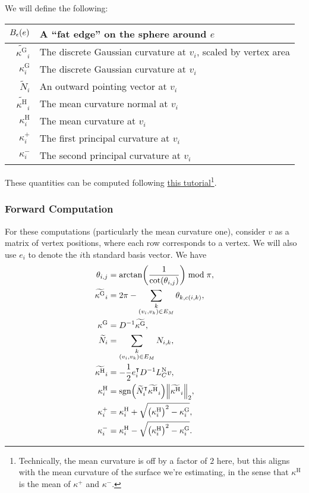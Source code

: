 
We will define the following: \begin{center}\begin{tabular}{r|l}
	\(B_{\epsilon}\pof{e}\) & A ``fat edge'' on the sphere around \(e\) \\ \hline
	\(\widetilde{\kappa^\text{G}}_i\) & The discrete Gaussian curvature at \(v_i\), scaled by vertex area \\ \hline
	\(\kappa^\text{G}_i\) & The discrete Gaussian curvature at \(v_i\) \\ \hline
	\(\widetilde{N}_i\) & An outward pointing vector at \(v_i\) \\ \hline
	\(\widetilde{\kappa^\text{H}}_i\) & The mean curvature normal at \(v_i\) \\ \hline
	\(\kappa^\text{H}_i\) & The mean curvature at \(v_i\) \\ \hline
	\(\kappa^+_i\) & The first principal curvature at \(v_i\) \\ \hline
	\(\kappa^-_i\) & The second principal curvature at \(v_i\)
\end{tabular}\end{center} These quantities can be computed following \href{https://libigl.github.io/libigl-python-bindings/tut-chapter1/}{this tutorial}\footnote{Technically, the mean curvature is off by a factor of \(2\) here, but this aligns with the mean curvature of the surface we're estimating, in the sense that \(\kappa^{\text{H}}\) is the mean of \(\kappa^+\) and \(\kappa^-\).}.

\subsubsection{Forward Computation}
For these computations (particularly the mean curvature one), consider \(v\) as a matrix of vertex positions, where each row corresponds to a vertex. We will also use \(e_i\) to denote the \(i\)th standard basis vector. We have \begin{align*}
	\theta_{i, j} &= \arctan\pof{\frac{1}{\cot\pof{\theta_{i, j}}}} \bmod \pi, \\
	\widetilde{\kappa^\text{G}}_i &= 2\pi - \sum_{\substack{k \\ \pof{v_i, v_k} \in E_M}} \theta_{k, c\pof{i, k}}, \\
	\kappa^\text{G} &= D^{-1}\widetilde{\kappa^\text{G}}, \\
	\widetilde{N}_i &= \sum_{\substack{k \\ \pof{v_i, v_k} \in E_M}} N_{i, k}, \\
	\widetilde{\kappa^\text{H}}_i &= -\frac{1}{2}e_i^\intercal D^{-1}L_C^{\text{N}}v, \\
	\kappa^\text{H}_i &= \sgn\pof{\widetilde{N}_i^\intercal\widetilde{\kappa^\text{H}}_i}\norm{\widetilde{\kappa^\text{H}}_i}_2, \\
	\kappa^+_i &= \kappa^{\text{H}}_i + \sqrt{\pof{\kappa^{\text{H}}_i}^2 - \kappa^{\text{G}}_i}, \\
	\kappa^-_i &= \kappa^{\text{H}}_i - \sqrt{\pof{\kappa^{\text{H}}_i}^2 - \kappa^{\text{G}}_i}.
\end{align*}


